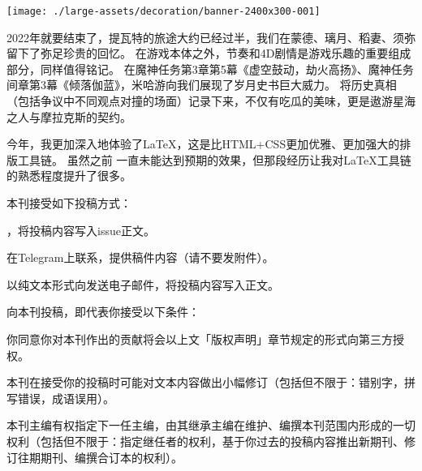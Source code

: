 


\isDraft
\noindent\texttt{[image: ./large-assets/decoration/banner-2400x300-001]}\par
\tableofcontents\clearpage






\dividearticles
{}

2022年就要结束了，提瓦特的旅途大约已经过半，我们在蒙德、璃月、稻妻、须弥留下了弥足珍贵的回忆。
在游戏本体之外，节奏和4D剧情是游戏乐趣的重要组成部分，同样值得铭记。
在魔神任务第3章第5幕《虚空鼓动，劫火高扬》、魔神任务间章第3幕《倾落伽蓝》，米哈游向我们展现了岁月史书巨大威力。
将历史真相（包括争议中不同观点对撞的场面）记录下来，不仅有吃瓜的美味，更是遨游星海之人与摩拉克斯的契约。

今年，我更加深入地体验了LaTeX，这是比HTML+CSS更加优雅、更加强大的排版工具链。
虽然之前\href{https://neruthesgithubdistweb.vercel.app/qyxt/qyxt/qyxt-2022-02.pdf}{}%
一直未能达到预期的效果，但那段经历让我对LaTeX工具链的熟悉程度提升了很多。


本刊接受如下投稿方式：

\begin{compactitem}
	\item \href{https://github.com/neruthes/ysplayerjournal}{}，将投稿内容写入issue正文。
	\item 在Telegram上联系\CJKecglue\href{https://t.me/neruthes}{}，提供稿件内容（请不要发附件）。
	\item 以纯文本形式向发送电子邮件，将投稿内容写入正文。
\end{compactitem}

向本刊投稿，即代表你接受以下条件：

\begin{compactitem}
	\item 你同意你对本刊作出的贡献将会以上文「版权声明」章节规定的形式向第三方授权。
	\item 本刊在接受你的投稿时可能对文本内容做出小幅修订（包括但不限于：错别字，拼写错误，成语误用）。
	\item 本刊主编有权指定下一任主编，由其继承主编在维护、编撰本刊范围内形成的一切权利（包括但不限于：指定继任者的权利，基于你过去的投稿内容推出新期刊、修订往期期刊、编撰合订本的权利）。
\end{compactitem}






